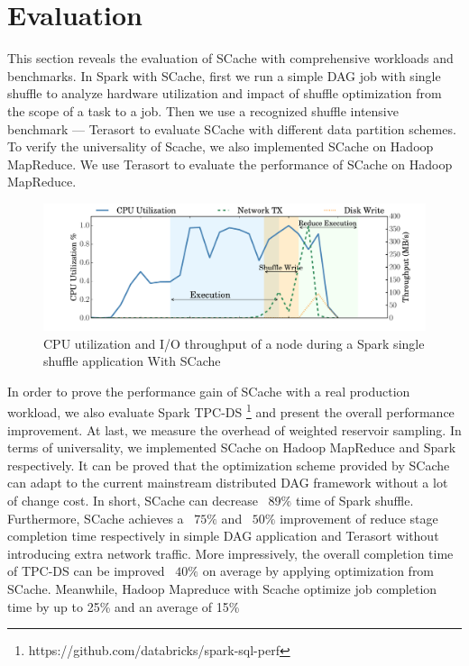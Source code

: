 \section{Evaluation}\label{evaluation}
This section reveals the evaluation of SCache with comprehensive workloads and benchmarks. 
{\color{blue}In Spark with SCache, }
first we run a simple DAG job with single shuffle to analyze hardware utilization and impact of shuffle optimization from the scope of a task to a job. 
Then we use a recognized shuffle intensive benchmark --- Terasort \cite{spark-tera} to evaluate SCache with different data partition schemes.
{\color{blue}To verify the universality of Scache, we also implemented SCache on Hadoop MapReduce. We use Terasort to evaluate the performance of SCache on Hadoop MapReduce.}

\begin{figure}
	\includegraphics[width=\linewidth]{fig/scache_util}
	\caption{CPU utilization and I/O throughput of a node during a Spark single shuffle application With SCache}
	\label{fig:scache_util}
\end{figure}

In order to prove the performance gain of SCache with a real production workload, we also evaluate Spark TPC-DS \footnote{https://github.com/databricks/spark-sql-perf} and present the overall performance improvement.
At last, we measure the overhead of weighted reservoir sampling. 
{\color{blue}In terms of universality, we implemented SCache on Hadoop MapReduce and Spark respectively. It can be proved that the optimization scheme provided by SCache can adapt to the current mainstream distributed DAG framework without a lot of change cost.}
In short, SCache can decrease ~$89\%$ time of Spark shuffle. Furthermore, SCache achieves a ~$75\%$ and ~$50\%$ improvement of reduce stage completion time respectively in simple DAG application and Terasort without introducing extra network traffic. More impressively, the overall completion time of TPC-DS can be improved ~$40\%$ on average by applying optimization from SCache.
{\color{blue}Meanwhile, Hadoop Mapreduce with Scache optimize job completion time by up to 25\% and an average of 15\%}

